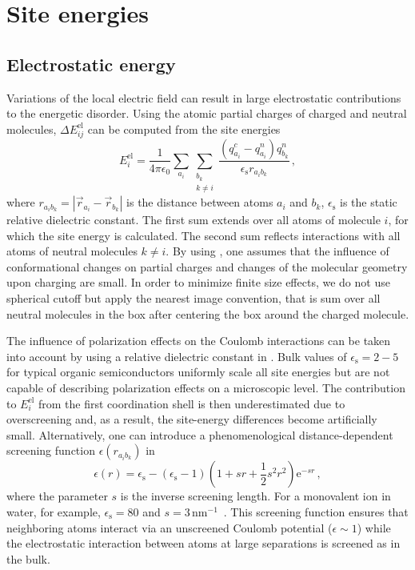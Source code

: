 \chapter{Site energies}
\label{sec:site_energies}

\newcommand{\estat}{\hyperref[calc:estat]{\texttt{estat}}\xspace}

\section{Electrostatic energy}
\label{sec:electrostatic}
Variations of the local electric field can result in large electrostatic contributions to the energetic disorder. Using the atomic partial charges of charged and neutral molecules, $\Delta E_{ij}^\text{el}$ can be computed from the site energies~\cite{kirkpatrick_columnar_2008}
\begin{equation}
E_{i}^\text{el}  = \frac{1}{4 \pi \epsilon_0} \sum_{a_i} \sum_{\substack{b_k   \\ k\neq i }}
\frac{ \left( q^c_{a_i} - q^n_{a_i} \right) q^n_{b_k}}{ \epsilon_\text{s} r_{a_i b_k}} 
\, ,
\label{equ:estatic}
\end{equation}
where $r_{a_i b_k}=|\vec{r}_{a_i} - \vec{r}_{b_k}|$ is the distance between atoms $a_i$ and $b_k$,   $\epsilon_\text{s}$ is the static relative dielectric constant.
%
The first sum extends over all atoms of molecule $i$, for which the site energy is calculated. The second sum reflects interactions with all atoms of neutral molecules $k \ne i$. By using , one assumes that the influence of conformational changes on partial charges and changes of the molecular geometry upon charging are small. In order to minimize finite size effects, we do not use spherical cutoff but apply the nearest image convention, that is sum over all neutral molecules in the box after centering the box around the charged molecule. 

The influence of polarization effects on the Coulomb interactions can be taken into account by using a relative dielectric constant in . Bulk values of  $\epsilon_\text{s} = 2-5$ for typical organic semiconductors uniformly scale all site energies but are not capable of describing polarization effects on a microscopic level. 
The contribution to $E_i^\text{el}$ from the first coordination shell is then underestimated due to overscreening and, as a result, the site-energy differences become artificially small. Alternatively, one can introduce a phenomenological distance-dependent screening function $\epsilon(r_{a_i b_k})$ in~~\cite{nagata_atomistic_2008}
\begin{equation}
\epsilon(r)=\epsilon_{\text{s}} - (\epsilon_{\text{s}} - 1)
\left( 1 + sr + \frac{1}{2}s^2r^2 \right) 
\mathrm{e}^{ -sr}\,,
\label{equ:epss}
\end{equation}
where the parameter $s$ is the inverse screening length. For a monovalent ion in water, for example, $\epsilon_{\text{s}}=80$ and $s=3\,\textrm{nm}^{-1}$~\cite{daggett_molecular_1991}. This screening function ensures that neighboring atoms interact via an unscreened Coulomb potential ($\epsilon \sim 1$) while the electrostatic interaction between atoms at large separations is screened as in the bulk. 

